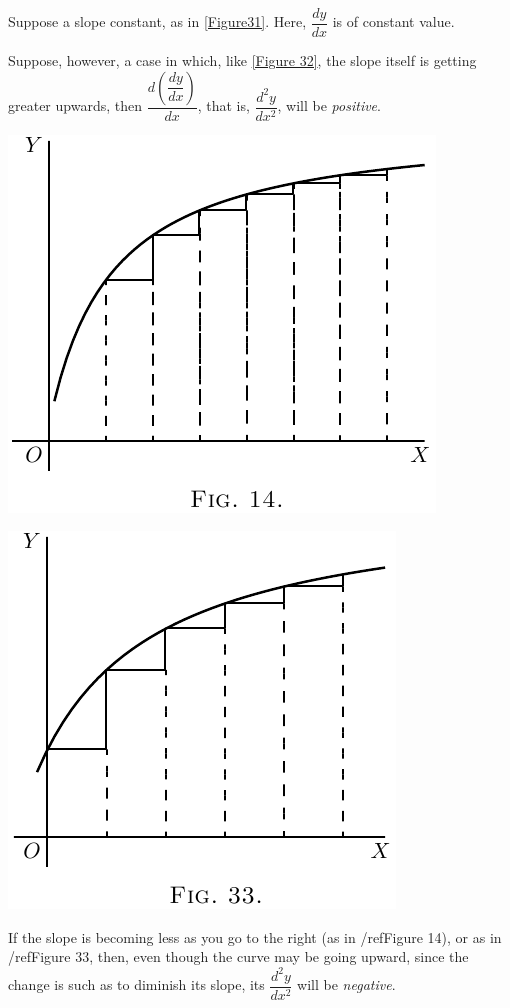 \documentclass{ximera}
\begin{document}
Suppose a slope constant, as in \ref{Figure31}.
Here, $\dfrac{dy}{dx}$ is of constant value.


Suppose, however, a case in which, like \ref{Figure 32},
the slope itself is getting greater upwards, then
$\dfrac{d\left(\dfrac{dy}{dx}\right)}{dx}$, that is, $\dfrac{d^2y}{dx^2}$, will be \textit{positive}.

\begin{image}
\label{Figure14}
\includegraphics{093a.png}
\end{image}
\begin{image}
\label{Figure33}
\includegraphics{125a.png}
\end{image}

If the slope is becoming less as you go to the right
(as in /ref{Figure 14}), or as in /ref{Figure 33}, then, even
though the curve may be going upward, since the
change is such as to diminish its slope, its $\dfrac{d^2y}{dx^2}$ will
be \textit{negative}.
\end{document}
